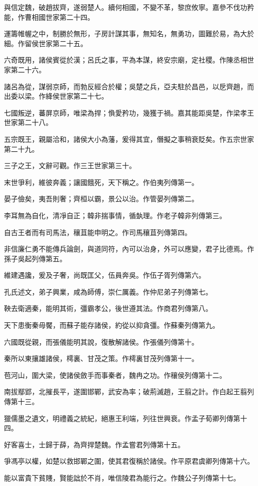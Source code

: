 \begin{pinyinscope}
與信定魏，破趙拔齊，遂弱楚人。續何相國，不變不革，黎庶攸寧。嘉參不伐功矜能，作曹相國世家第二十四。

運籌帷幄之中，制勝於無形，子房計謀其事，無知名，無勇功，圖難於易，為大於細。作留侯世家第二十五。

六奇既用，諸侯賓從於漢；呂氏之事，平為本謀，終安宗廟，定社稷。作陳丞相世家第二十六。

諸呂為從，謀弱京師，而勃反經合於權；吳楚之兵，亞夫駐於昌邑，以戹齊趙，而出委以梁。作絳侯世家第二十七。

七國叛逆，蕃屏京師，唯梁為捍；偩愛矜功，幾獲于禍。嘉其能距吳楚，作梁孝王世家第二十八。

五宗既王，親屬洽和，諸侯大小為藩，爰得其宜，僭擬之事稍衰貶矣。作五宗世家第二十九。

三子之王，文辭可觀。作三王世家第三十。

末世爭利，維彼奔義；讓國餓死，天下稱之。作伯夷列傳第一。

晏子儉矣，夷吾則奢；齊桓以霸，景公以治。作管晏列傳第二。

李耳無為自化，清凈自正；韓非揣事情，循埶理。作老子韓非列傳第三。

自古王者而有司馬法，穰苴能申明之。作司馬穰苴列傳第四。

非信廉仁勇不能傳兵論劍，與道同符，內可以治身，外可以應變，君子比德焉。作孫子吳起列傳第五。

維建遇讒，爰及子奢，尚既匡父，伍員奔吳。作伍子胥列傳第六。

孔氏述文，弟子興業，咸為師傅，崇仁厲義。作仲尼弟子列傳第七。

鞅去衛適秦，能明其術，彊霸孝公，後世遵其法。作商君列傳第八。

天下患衡秦毋饜，而蘇子能存諸侯，約從以抑貪彊。作蘇秦列傳第九。

六國既從親，而張儀能明其說，復散解諸侯。作張儀列傳第十。

秦所以東攘雄諸侯，樗裏、甘茂之策。作樗裏甘茂列傳第十一。

苞河山，圍大梁，使諸侯斂手而事秦者，魏冉之功。作穰侯列傳第十二。

南拔鄢郢，北摧長平，遂圍邯鄲，武安為率；破荊滅趙，王翦之計。作白起王翦列傳第十三。

獵儒墨之遺文，明禮義之統紀，絕惠王利端，列往世興衰。作孟子荀卿列傳第十四。

好客喜士，士歸于薛，為齊捍楚魏。作孟嘗君列傳第十五。

爭馮亭以權，如楚以救邯鄲之圍，使其君復稱於諸侯。作平原君虞卿列傳第十六。

能以富貴下貧賤，賢能詘於不肖，唯信陵君為能行之。作魏公子列傳第十七。


\end{pinyinscope}

